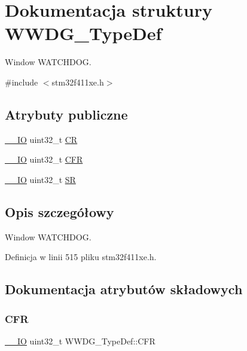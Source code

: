 \hypertarget{struct_w_w_d_g___type_def}{}\section{Dokumentacja struktury W\+W\+D\+G\+\_\+\+Type\+Def}
\label{struct_w_w_d_g___type_def}


Window W\+A\+T\+C\+H\+D\+OG.  




{\ttfamily \#include $<$stm32f411xe.\+h$>$}

\subsection*{Atrybuty publiczne}
\begin{DoxyCompactItemize}
\item 
\hyperlink{core__sc300_8h_aec43007d9998a0a0e01faede4133d6be}{\+\_\+\+\_\+\+IO} uint32\+\_\+t \hyperlink{struct_w_w_d_g___type_def_a4caf530d45f7428c9700d9c0057135f8}{CR}
\item 
\hyperlink{core__sc300_8h_aec43007d9998a0a0e01faede4133d6be}{\+\_\+\+\_\+\+IO} uint32\+\_\+t \hyperlink{struct_w_w_d_g___type_def_adcd6a7e5d75022e46ce60291f4b8544c}{C\+FR}
\item 
\hyperlink{core__sc300_8h_aec43007d9998a0a0e01faede4133d6be}{\+\_\+\+\_\+\+IO} uint32\+\_\+t \hyperlink{struct_w_w_d_g___type_def_a15655cda4854cc794db1f27b3c0bba38}{SR}
\end{DoxyCompactItemize}


\subsection{Opis szczegółowy}
Window W\+A\+T\+C\+H\+D\+OG. 

Definicja w linii 515 pliku stm32f411xe.\+h.



\subsection{Dokumentacja atrybutów składowych}
\mbox{\label{struct_w_w_d_g___type_def_adcd6a7e5d75022e46ce60291f4b8544c}} 
\subsubsection{\texorpdfstring{C\+FR}{CFR}}
{\footnotesize\ttfamily \hyperlink{core__sc300_8h_aec43007d9998a0a0e01faede4133d6be}{\+\_\+\+\_\+\+IO} uint32\+\_\+t W\+W\+D\+G\+\_\+\+Type\+Def\+::\+C\+FR}

